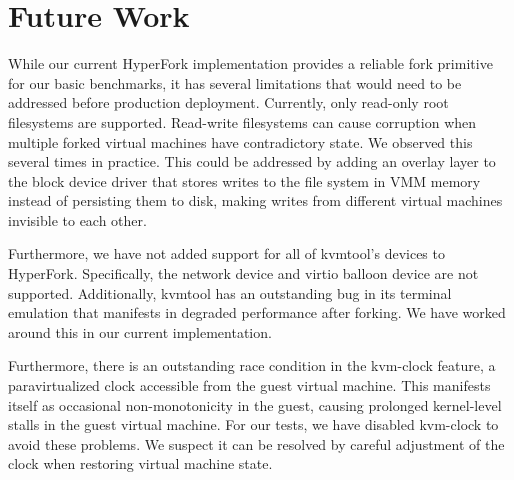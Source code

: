\section{Future Work} \label{sec:future}

 While our current HyperFork implementation provides a
reliable fork primitive for our basic benchmarks, it has several limitations
that would need to be addressed before production deployment. Currently, only
read-only root filesystems are supported. Read-write filesystems can cause
corruption when multiple forked virtual machines have contradictory state. We
observed this several times in practice. This could be addressed by adding an
overlay layer to the block device driver that stores writes to the file system
in VMM memory instead of persisting them to disk, making writes from different
virtual machines invisible to each other.

Furthermore, we have not added support for all of kvmtool's devices to
HyperFork. Specifically, the network device and virtio balloon device are not
supported. Additionally, kvmtool has an outstanding bug in its terminal
emulation that manifests in degraded performance after forking. We have worked
around this in our current implementation.

Furthermore, there is an outstanding race condition in the kvm-clock feature, a
paravirtualized clock accessible from the guest virtual machine. This manifests
itself as occasional non-monotonicity in the guest, causing prolonged
kernel-level stalls in the guest virtual machine. For our tests, we have
disabled kvm-clock to avoid these problems. We suspect it can be resolved by
careful adjustment of the clock when restoring virtual machine state.


